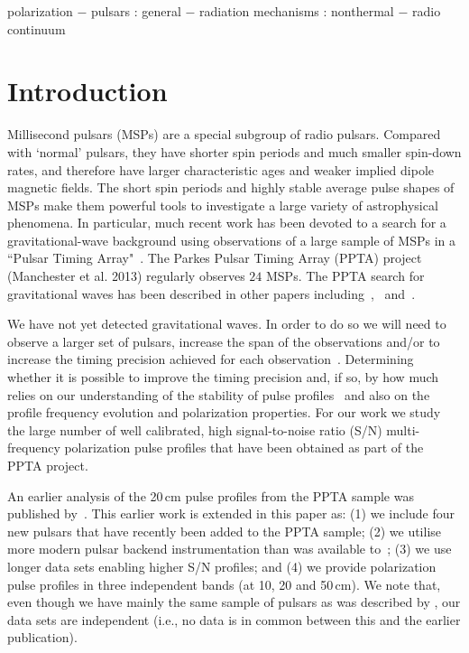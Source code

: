 \documentclass[useAMS,usenatbib]{mn2e}
\begin{document}
\begin{keywords}
%
polarization $-$ pulsars : general $-$ radiation mechanisms : nonthermal $-$ radio continuum 
%
\end{keywords}


\section{Introduction}

Millisecond pulsars (MSPs) are a special subgroup of radio pulsars. 
%
Compared with `normal' pulsars, they have shorter spin periods 
and much smaller spin-down rates, and therefore have larger characteristic 
ages and weaker implied dipole magnetic fields.
%
The short spin periods and highly stable average pulse shapes of MSPs 
make them powerful tools to investigate a large variety of astrophysical phenomena.
In particular, much recent work has been devoted to a search for a gravitational-wave 
background using observations of a large sample of MSPs in a ``Pulsar Timing Array"~\citep[e.g.,][]{Foster90}.
%
The Parkes Pulsar Timing Array (PPTA) project (Manchester et al. 2013) 
regularly observes $24$ MSPs. 
%
The PPTA search for gravitational waves has been described in other papers 
including~\citet{Shannon13b},~\citet{Zhu14} and~\citet{Wang15}. 
%

We have not yet detected gravitational waves. In order to do so we will need 
to observe a larger set of pulsars, increase the span of the observations and/or 
to increase the timing precision achieved for each observation~\citep[e.g.,][]{Cordes12}. 
%
Determining whether it is possible to improve the timing precision and, if so, 
by how much relies on our understanding of the stability of pulse profiles~\citep[e.g.,][]{Shannon14} 
and also on the profile frequency evolution and polarization properties.
%
For our work we study the large number of well calibrated, high signal-to-noise 
ratio (S/N) multi-frequency polarization pulse profiles that have been obtained as 
part of the PPTA project. 
%

An earlier analysis of the 20\,cm pulse profiles from the PPTA sample was published by~\citet{Yan11}. 
This earlier work is extended in this paper as:
%
(1) we include four new pulsars that have recently been added to the PPTA sample;
(2) we utilise more modern pulsar backend instrumentation than was available to~\citet{Yan11};
(3) we use longer data sets enabling higher S/N profiles; and
(4) we provide polarization pulse profiles in three independent bands 
(at 10, 20 and 50\,cm).
%
We note that, even though we have mainly the same sample of pulsars as was described by \citet{Yan11}, 
our data sets are independent (i.e., no data is in common between this and the earlier 
publication).
\end{document}

